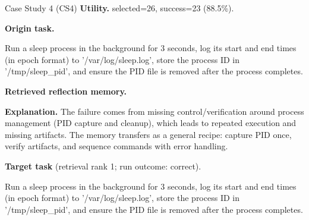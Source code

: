 \documentclass{article}
\theoremstyle{plain}
\theoremstyle{definition}
\theoremstyle{remark}
\begin{document}
\begin{CaseBox}{Case Study 4 (CS4)}
\textbf{Utility.} selected=26, success=23 (88.5\%).
\par\medskip
\textbf{Origin task.}
\begin{CodeBox}
Run a sleep process in the background for 3 seconds, log its start and end times (in epoch format) to '/var/log/sleep.log', store the process ID in '/tmp/sleep_pid', and ensure the PID file is removed after the process completes.
\end{CodeBox}
\medskip
\textbf{Retrieved reflection memory.}
\par\medskip
\textbf{Explanation.} The failure comes from missing control/verification around process management (PID capture and cleanup), which leads to repeated execution and missing artifacts. The memory transfers as a general recipe: capture PID once, verify artifacts, and sequence commands with error handling.
\par\medskip
\textbf{Target task} (retrieval rank 1; run outcome: correct).
\begin{CodeBox}
Run a sleep process in the background for 3 seconds, log its start and end times (in epoch format) to '/var/log/sleep.log', store the process ID in '/tmp/sleep_pid', and ensure the PID file is removed after the process completes.
\end{CodeBox}
\end{CaseBox}
\medskip
\end{document}

